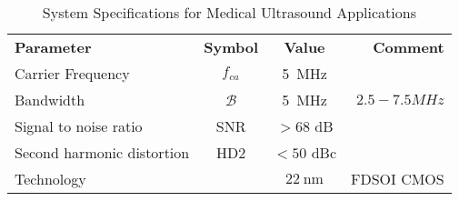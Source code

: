 
\begin{table}[htbp]
    \centering
    \caption{System Specifications for Medical Ultrasound Applications}
      \begin{tabular}{lccr}
      \rowcolor[rgb]{ 0,  0,  0} \textcolor[rgb]{ 1,  1,  1}{\textbf{Parameter}}	 & \textcolor[rgb]{ 1,  1,  1}{\textbf{Symbol}}
                               & \textcolor[rgb]{ 1,  1,  1}{\textbf{Value}}       & \textcolor[rgb]{ 1,  1,  1}{\textbf{Comment}}    \\
      Carrier Frequency & $f_{ca}$ & \SI{5}{MHz} &                                                                                    \\
      Bandwidth & $\mathcal{B}$ & \SI{5}{MHz} & $2.5-7.5\si{MHz}$                                                                     \\
      Signal to noise ratio & SNR & $>68$ dB &                                                                                        \\
      Second harmonic distortion & HD2 & $<50$ dBc &                                                                                        \\
      Technology & & $\SI{22}{\nano\metre}$ & FDSOI CMOS
      \end{tabular}
    \label{tab:adc_specs}
  \end{table}


